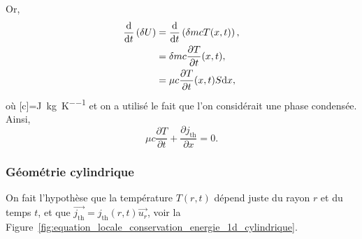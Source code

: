                 Or,
                \begin{align}
                    \frac{\mathrm{d}}{\mathrm{d} t}\left(\delta U\right)
                    &=
                    \frac{\mathrm{d}}{\mathrm{d} t}\left(\delta m cT(x,t)\right),\\
                    &=
                    \delta m c\frac{\partial T}{\partial t}(x,t),\\
                    &=\mu c\frac{\partial T}{\partial t}(x,t) S\mathrm{d} x,
                \end{align}
                où [c]=\si{\joule\per\kilogram\per\kelvin} et on a utilisé le fait que l'on considérait une phase condensée. Ainsi,
                \begin{equation}
                    \boxed{
                        \mu c\frac{\partial T}{\partial t}+\frac{\partial j_{\text{th}}}{\partial x}=0.
                    }
                \end{equation}

        \subsubsection{Géométrie cylindrique}

            On fait l'hypothèse que la température $T(r,t)$ dépend juste du rayon $r$ et du temps $t$, et que $\vec{j_{\text{th}}}=j_{\text{th}}(r,t)\vec{u_r}$, voir la Figure~\ref{fig:equation_locale_conservation_energie_1d_cylindrique}.

